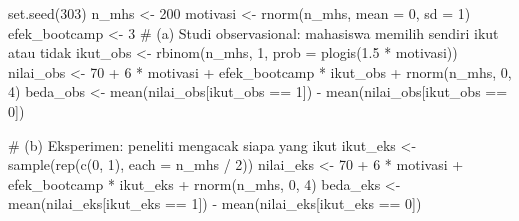 \documentclass[
  indonesian,
  letterpaper,
]{book}
\newenvironment{Shaded}{\begin{snugshade}}{\end{snugshade}}
\newcommand{\AttributeTok}[1]{\textcolor[rgb]{0.40,0.45,0.13}{#1}}
\newcommand{\CommentTok}[1]{\textcolor[rgb]{0.37,0.37,0.37}{#1}}
\newcommand{\DecValTok}[1]{\textcolor[rgb]{0.68,0.00,0.00}{#1}}
\newcommand{\FloatTok}[1]{\textcolor[rgb]{0.68,0.00,0.00}{#1}}
\newcommand{\FunctionTok}[1]{\textcolor[rgb]{0.28,0.35,0.67}{#1}}
\newcommand{\NormalTok}[1]{\textcolor[rgb]{0.00,0.23,0.31}{#1}}
\newcommand{\OtherTok}[1]{\textcolor[rgb]{0.00,0.23,0.31}{#1}}
\newcommand{\SpecialCharTok}[1]{\textcolor[rgb]{0.37,0.37,0.37}{#1}}
\begin{document}
\begin{Shaded}
\begin{Highlighting}[]
\FunctionTok{set.seed}\NormalTok{(}\DecValTok{303}\NormalTok{)}
\NormalTok{n\_mhs }\OtherTok{\textless{}{-}} \DecValTok{200}
\NormalTok{motivasi }\OtherTok{\textless{}{-}} \FunctionTok{rnorm}\NormalTok{(n\_mhs, }\AttributeTok{mean =} \DecValTok{0}\NormalTok{, }\AttributeTok{sd =} \DecValTok{1}\NormalTok{)}
\NormalTok{efek\_bootcamp }\OtherTok{\textless{}{-}} \DecValTok{3}
\CommentTok{\# (a) Studi observasional: mahasiswa memilih sendiri ikut atau tidak}
\NormalTok{ikut\_obs }\OtherTok{\textless{}{-}} \FunctionTok{rbinom}\NormalTok{(n\_mhs, }\DecValTok{1}\NormalTok{, }\AttributeTok{prob =} \FunctionTok{plogis}\NormalTok{(}\FloatTok{1.5} \SpecialCharTok{*}\NormalTok{ motivasi))}
\NormalTok{nilai\_obs }\OtherTok{\textless{}{-}} \DecValTok{70} \SpecialCharTok{+} \DecValTok{6} \SpecialCharTok{*}\NormalTok{ motivasi }\SpecialCharTok{+}\NormalTok{ efek\_bootcamp }\SpecialCharTok{*}\NormalTok{ ikut\_obs }\SpecialCharTok{+} \FunctionTok{rnorm}\NormalTok{(n\_mhs, }\DecValTok{0}\NormalTok{, }\DecValTok{4}\NormalTok{)}
\NormalTok{beda\_obs }\OtherTok{\textless{}{-}} \FunctionTok{mean}\NormalTok{(nilai\_obs[ikut\_obs }\SpecialCharTok{==} \DecValTok{1}\NormalTok{]) }\SpecialCharTok{{-}} \FunctionTok{mean}\NormalTok{(nilai\_obs[ikut\_obs }\SpecialCharTok{==} \DecValTok{0}\NormalTok{])}

\CommentTok{\# (b) Eksperimen: peneliti mengacak siapa yang ikut}
\NormalTok{ikut\_eks }\OtherTok{\textless{}{-}} \FunctionTok{sample}\NormalTok{(}\FunctionTok{rep}\NormalTok{(}\FunctionTok{c}\NormalTok{(}\DecValTok{0}\NormalTok{, }\DecValTok{1}\NormalTok{), }\AttributeTok{each =}\NormalTok{ n\_mhs }\SpecialCharTok{/} \DecValTok{2}\NormalTok{))}
\NormalTok{nilai\_eks }\OtherTok{\textless{}{-}} \DecValTok{70} \SpecialCharTok{+} \DecValTok{6} \SpecialCharTok{*}\NormalTok{ motivasi }\SpecialCharTok{+}\NormalTok{ efek\_bootcamp }\SpecialCharTok{*}\NormalTok{ ikut\_eks }\SpecialCharTok{+} \FunctionTok{rnorm}\NormalTok{(n\_mhs, }\DecValTok{0}\NormalTok{, }\DecValTok{4}\NormalTok{)}
\NormalTok{beda\_eks }\OtherTok{\textless{}{-}} \FunctionTok{mean}\NormalTok{(nilai\_eks[ikut\_eks }\SpecialCharTok{==} \DecValTok{1}\NormalTok{]) }\SpecialCharTok{{-}} \FunctionTok{mean}\NormalTok{(nilai\_eks[ikut\_eks }\SpecialCharTok{==} \DecValTok{0}\NormalTok{])}


\end{Highlighting}
\end{Shaded}
\end{document}

